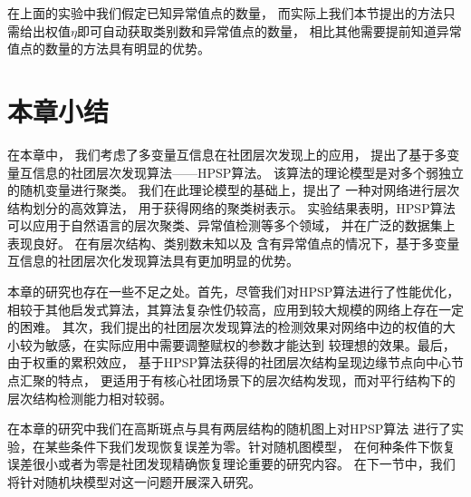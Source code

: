 在上面的实验中我们假定已知异常值点的数量，
而实际上我们本节提出的方法只需给出权值$\eta$即可自动获取类别数和异常值点的数量，
相比其他需要提前知道异常值点的数量的方法具有明显的优势。



\section{本章小结}\label{sec:hierarchical_summary}
在本章中，
我们考虑了多变量互信息在社团层次发现上的应用，
提出了基于多变量互信息的社团层次发现算法——HPSP算法。
该算法的理论模型是对多个弱独立的随机变量进行聚类。
我们在此理论模型的基础上，提出了
一种对网络进行层次结构划分的高效算法，
用于获得网络的聚类树表示。
实验结果表明，HPSP算法可以应用于自然语言的层次聚类、异常值检测等多个领域，
并在广泛的数据集上表现良好。
在有层次结构、类别数未知以及
含有异常值点的情况下，基于多变量互信息的社团层次化发现算法具有更加明显的优势。


本章的研究也存在一些不足之处。首先，尽管我们对HPSP算法进行了性能优化，
相较于其他启发式算法，其算法复杂性仍较高，应用到较大规模的网络上存在一定的困难。
其次，我们提出的社团层次发现算法的检测效果对网络中边的权值的大小较为敏感，在实际应用中需要调整赋权的参数才能达到
较理想的效果。最后，由于权重的累积效应，
基于HPSP算法获得的社团层次结构呈现边缘节点向中心节点汇聚的特点，
更适用于有核心社团\cite{wang2011detecting}场景下的层次结构发现，而对平行结构下的层次结构检测能力相对较弱。

在本章的研究中我们在高斯斑点与具有两层结构的随机图上对HPSP算法
进行了实验，在某些条件下我们发现恢复误差为零。针对随机图模型，
在何种条件下恢复误差很小或者为零是社团发现精确恢复理论重要的研究内容。
在下一节中，我们将针对随机块模型对这一问题开展深入研究。
